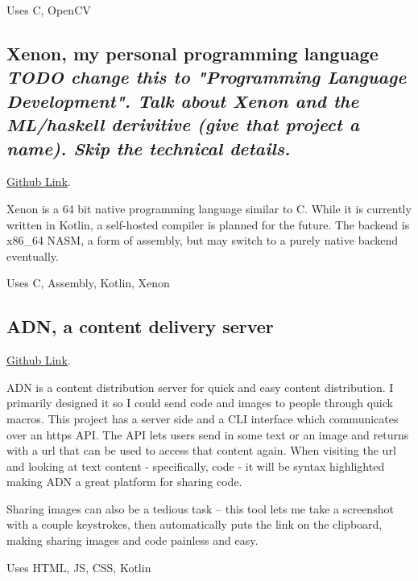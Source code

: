 \documentclass[10pt,letterpaper]{article}
\def\link#1#2{\color{blue!60!black}\href{#1}{#2}\color{black}}
\newcommand{\CPP}
{C\nolinebreak[4]\hspace{-.05em}\raisebox{.35ex}{\footnotesize\bf ++}}
\begin{document}
    \vspace{0.5em}
    \noindent Uses \CPP, OpenCV

    \subsection*{Xenon, my personal programming language \textit{TODO change this to "Programming Language Development". Talk about Xenon and the ML/haskell derivitive (give that project a name). Skip the technical details.}}
    \link{https://github.com/Mee42/Xenon}{Github Link}.
    
    Xenon is a 64 bit native programming language similar to C.
    While it is currently written in Kotlin, a self-hosted compiler is planned for the future.
    The backend is x86\_64 NASM, a form of assembly,
    but may switch to a purely native backend eventually.
    
    \vspace{0.5em}
    \noindent Uses C, Assembly, Kotlin, Xenon

    \subsection*{ADN, a content delivery server}
    
    \link{https://github.com/mee42/adn}{Github Link}.
    
    ADN is a content distribution server for quick and easy content distribution.
    I primarily designed it so I could send code and images to people through quick macros.
    This project has a server side and a CLI interface which communicates over an https API.
    The API lets users send in some text or an image
    and returns with a url that can be used to access that content again.
    When visiting the url and looking at text content - specifically, code - it will be syntax highlighted
    making ADN a great platform for sharing code.

    Sharing images can also be a tedious task -- 
    this tool lets me take a screenshot with a couple keystrokes,
    then automatically puts the link on the clipboard,
    making sharing images and code painless and easy.

    \vspace{0.5em}
    \noindent Uses HTML, JS, CSS, Kotlin
\end{document}
